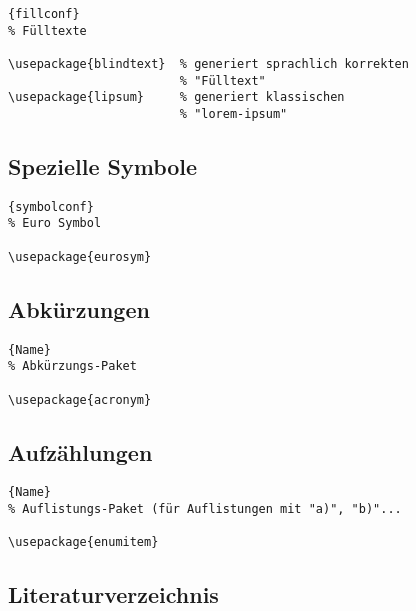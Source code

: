 \begin{center}
\begin{lstlisting}[caption=Fuelltext]{fillconf}
% Fülltexte

\usepackage{blindtext}  % generiert sprachlich korrekten
                        % "Fülltext"
\usepackage{lipsum}     % generiert klassischen
                        % "lorem-ipsum"
\end{lstlisting}
\end{center}

\subsection{Spezielle Symbole}

\begin{center}
\begin{lstlisting}[caption=Euro-Symbol]{symbolconf}
% Euro Symbol

\usepackage{eurosym}
\end{lstlisting}
\end{center}

\subsection{Abkürzungen}

\begin{center}
\begin{lstlisting}[caption=Abkuerzungen]{Name}
% Abkürzungs-Paket 

\usepackage{acronym}
\end{lstlisting}
\end{center}

\subsection{Aufzählungen}

\begin{center}
\begin{lstlisting}[caption=Auflistungen]{Name}
% Auflistungs-Paket (für Auflistungen mit "a)", "b)"...

\usepackage{enumitem}
\end{lstlisting}
\end{center}

\subsection{Literaturverzeichnis}

